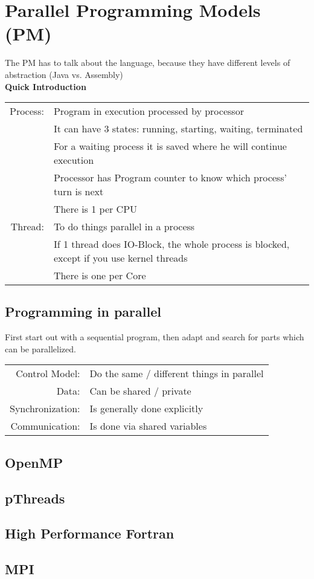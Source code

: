 \documentclass[a4paper]{article}
\begin{document}
\section{Parallel Programming Models (PM)}
The PM has to talk about the language, because they have different levels of abstraction (Java vs. Assembly)\\
{\bf Quick Introduction}\\
\begin{tabular}{rl}
Process:& Program in execution processed by processor\\&It can have 3 states: running, starting, waiting, terminated\\& For a waiting process it is saved where he will continue execution\\&Processor has Program counter to know which process' turn is next\\&There is 1 per CPU\\
Thread:& To do things parallel in a process\\& If 1 thread does IO-Block, the whole process is blocked, except if you use kernel threads\\& There is one per Core
\end{tabular}

\subsection{Programming in parallel}
First start out with a sequential program, then adapt and search for parts which can be parallelized.\\
\begin{tabular}{rl}
Control Model:& Do the same / different things in parallel\\
Data:& Can be shared / private\\
Synchronization:& Is generally done explicitly\\
Communication:& Is done via shared variables
\end{tabular}

\subsection{OpenMP}
\subsection{pThreads}
\subsection{High Performance Fortran}
\subsection{MPI}
\end{document}
